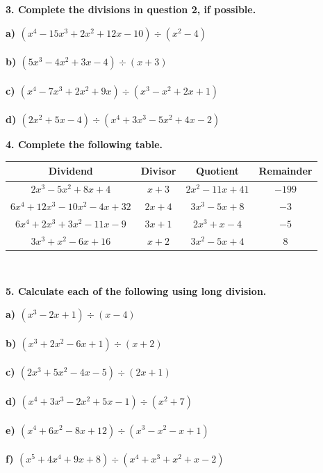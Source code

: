 \documentclass[14pt, a4paper]{extarticle}
\begin{document}
\textbf{3. Complete the divisions in question 2, if possible.} \\
\begin{adjustwidth}{1cm}{0pt}
    \textbf{a) $(x^4 - 15x^3 + 2x^2 + 12x - 10) \div (x^2 - 4)$} \\
    \\
    \textbf{b) $(5x^3 - 4x^2 + 3x - 4) \div (x + 3)$} \\
    \\
    \textbf{c) $(x^4 - 7x^3 + 2x^2 + 9x) \div (x^3 - x^2 + 2x + 1)$} \\
    \\
    \textbf{d) $(2x^2 + 5x - 4) \div (x^4 + 3x^3 - 5x^2 + 4x - 2)$} \\
\end{adjustwidth}

\textbf{4. Complete the following table.} \\
\begin{adjustwidth}{1cm}{0pt}
    \begin{tabular}{| c | c | c | c |}
        \hline
        \textbf{Dividend} & \textbf{Divisor} & \textbf{Quotient} & \textbf{Remainder} \\
        \hline
        \textbf{$2x^3 - 5x^2 + 8x + 4$} & \textbf{$x + 3$} & \textbf{$2x^2 - 11x + 41$} & $-199$ \\
        \hline
        $6x^4 + 12x^3 - 10x^2 - 4x + 32$ & \textbf{$2x + 4$} & \textbf{$3x^3 - 5x + 8$} & \textbf{$-3$} \\
        \hline
        \textbf{$6x^4 + 2x^3 + 3x^2 - 11x - 9$} & $3x + 1$ & \textbf{$2x^3 + x - 4$} & \textbf{$-5$} \\
        \hline
        \textbf{$3x^3 + x^2 - 6x + 16$} & \textbf{$x + 2$} & $3x^2 - 5x + 4$ & \textbf{$8$} \\
        \hline
    \end{tabular}
    \\
\end{adjustwidth}

\textbf{5. Calculate each of the following using long division.} \\
\begin{adjustwidth}{1cm}{0pt}
    \textbf{a) $(x^3 - 2x + 1) \div (x - 4)$} \\
    \\
    \textbf{b) $(x^3 + 2x^2 - 6x + 1) \div (x + 2)$} \\
    \\
    \textbf{c) $(2x^3 + 5x^2 - 4x - 5) \div (2x + 1)$} \\
    \\
    \textbf{d) $(x^4 + 3x^3 - 2x^2 + 5x - 1) \div (x^2 + 7)$} \\
    \\
    \textbf{e) $(x^4 +6x^2 - 8x + 12) \div (x^3 - x^2 - x + 1)$} \\
    \\
    \textbf{f) $(x^5 + 4x^4 + 9x + 8) \div (x^4 + x^3 + x^2 + x - 2)$} \\
\end{adjustwidth}
\end{document}
